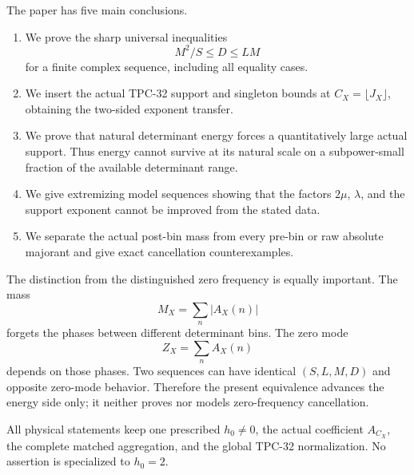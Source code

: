 The paper has five main conclusions.
\begin{enumerate}[label=(\roman*),leftmargin=2.2em]
\item We prove the sharp universal inequalities
\[
 M^2/S\le D\le LM
\]
for a finite complex sequence, including all equality cases.
\item We insert the actual TPC-32 support and singleton bounds at
\(C_X=\lfloor J_X\rfloor\), obtaining the two-sided exponent
transfer.
\item We prove that natural determinant energy forces a quantitatively
large actual support.  Thus energy cannot survive at its natural
scale on a subpower-small fraction of the available determinant
range.
\item We give extremizing model sequences showing that the factors
\(2\mu\), \(\lambda\), and the support exponent cannot be improved
from the stated data.
\item We separate the actual post-bin mass from every pre-bin or raw
absolute majorant and give exact cancellation counterexamples.
\end{enumerate}

The distinction from the distinguished zero frequency is equally
important.  The mass
\[
 M_X=\sum_n|A_X(n)|
\]
forgets the phases between different determinant bins.  The zero
mode
\[
 Z_X=\sum_n A_X(n)
\]
depends on those phases.  Two sequences can have identical
\((S,L,M,D)\) and opposite zero-mode behavior.  Therefore the present
equivalence advances the energy side only; it neither proves nor
models zero-frequency cancellation.

All physical statements keep one prescribed \(h_0\ne0\), the actual
coefficient \(A_{C_X}\), the complete matched aggregation, and the
global TPC-32 normalization.  No assertion is specialized to
\(h_0=2\).
